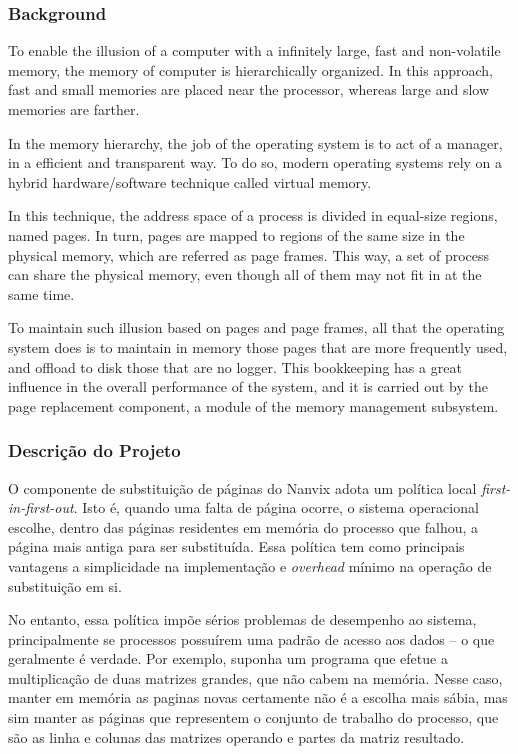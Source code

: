\documentclass[11pt]{article}
\newif\ifbr
\begin{document}
	\subsubsection*{Background}

		To enable the illusion of a computer with a infinitely large,
		fast and non-volatile memory, the memory of computer is
		hierarchically organized. In this approach, fast and small memories
		are placed near the processor, whereas large and slow memories
		are farther.

		In the memory hierarchy, the job of the operating system is to
		act of a manager, in a efficient and transparent way. To do so,
		modern operating systems rely on a hybrid hardware/software
		technique called virtual memory.

		In this technique, the address space of a process is divided in
		equal-size regions, named pages. In turn, pages are mapped to
		regions of the same size in the physical memory, which are
		referred as page frames. This way, a set of process can share
		the physical memory, even though all of them may not fit in at
		the same time.

		To maintain such illusion based on pages and page frames, all
		that the operating system does is to maintain in memory those
		pages that are more frequently used, and offload to disk those
		that are no logger. This bookkeeping has a great influence in
		the overall performance of the system, and it is carried out by
		the page replacement component, a module of the memory
		management subsystem.
\fi\fi
\ifbr
	\subsubsection*{Descrição do Projeto}

		O componente de substituição de páginas do Nanvix adota um
		política local \textit{first-in-first-out}. Isto é, quando uma
		falta de página ocorre, o sistema operacional escolhe, dentro
		das páginas residentes em memória do processo que falhou, a
		página mais antiga para ser substituída. Essa política tem como
		principais vantagens a simplicidade na implementação e
		\textit{overhead} mínimo na operação de substituição em si.

		No entanto, essa política impõe sérios problemas de desempenho
		ao sistema, principalmente se processos possuírem uma padrão de
		acesso aos dados -- o que geralmente é verdade. Por exemplo,
		suponha um programa que efetue a multiplicação de duas matrizes
		grandes, que não cabem na memória. Nesse caso, manter em memória
		as paginas novas certamente não é a escolha mais sábia, mas sim
		manter as páginas que representem o conjunto de trabalho do
		processo, que são as linha e colunas das matrizes operando e
		partes da matriz resultado.
\end{document}
